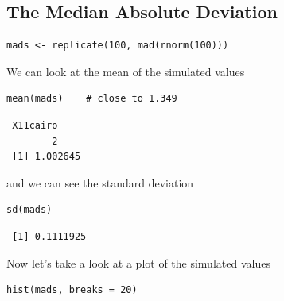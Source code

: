 \documentclass[captions=tableheading]{scrbook}
\begin{document}
\subsection{The Median Absolute Deviation}
\label{sec-8-5-2}



\begin{verbatim}
mads <- replicate(100, mad(rnorm(100)))
\end{verbatim}

We can look at the mean of the simulated values


\begin{verbatim}
mean(mads)    # close to 1.349
\end{verbatim}

\begin{verbatim}
 X11cairo 
        2
 [1] 1.002645
\end{verbatim}

and we can see the standard deviation


\begin{verbatim}
sd(mads)
\end{verbatim}

\begin{verbatim}
 [1] 0.1111925
\end{verbatim}

Now let's take a look at a plot of the simulated values


\begin{verbatim}
hist(mads, breaks = 20)
\end{verbatim}
\end{document}
